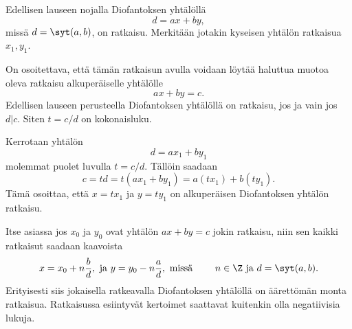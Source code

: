 
\begin{todistus}
Edellisen lauseen nojalla Diofantoksen yhtälöllä
\[
d= a x + b y,
\]
missä $d=\syt(a,b)$, on ratkaisu. Merkitään jotakin kyseisen yhtälön ratkaisua $x_1,y_1$.

On osoitettava, että tämän ratkaisun avulla voidaan löytää haluttua muotoa oleva ratkaisu alkuperäiselle yhtälölle
\[
a x + b y = c.
\]
Edellisen lauseen perusteella Diofantoksen yhtälöllä on ratkaisu, jos ja vain jos $d|c$. Siten $t=c/d$ on kokonaisluku.

Kerrotaan yhtälön
\[
d= a x_1 + b y_1
\]
molemmat puolet luvulla $t=c/d$. Tällöin saadaan
\[
c=td=t(a x_1 + b y_1) = a(tx_1)+ b(ty_1).
\]
Tämä osoittaa, että $x=tx_1$ ja $y=ty_1$ on alkuperäisen Diofantoksen yhtälön ratkaisu.
\end{todistus}

Itse asiassa jos $x_0$ ja $y_0$ ovat yhtälön $ax + by = c$ jokin ratkaisu, niin sen kaikki ratkaisut saadaan kaavoista
\[
x= x_0 + n\frac{b}{d}, \textrm{ ja } y=y_0 - n\frac{a}{d}, \textrm{ missä } \qquad n\in\Z \textrm{ ja } d=\syt(a,b).
\]
Erityisesti siis jokaisella ratkeavalla Diofantoksen yhtälöllä on äärettömän monta ratkaisua. Ratkaisussa esiintyvät kertoimet saattavat kuitenkin olla negatiivisia lukuja.

